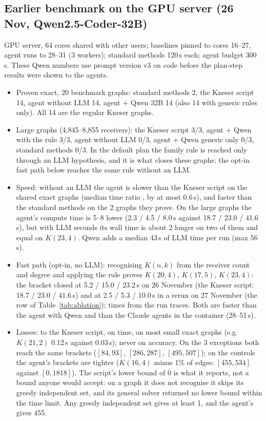 \subsection{Earlier benchmark on the GPU server (26 Nov, Qwen2.5-Coder-32B)}\label{sec:gpubench}
GPU server, 64 cores shared with other users; baselines pinned to cores 16--27, agent runs to 28--31 (3 workers);
standard methods 120\,s each; agent budget 300\,s. These Qwen numbers use prompt version v3 on code before the plan-step
results were shown to the agents.
\begin{itemize}
  \item Proven exact, 20 benchmark graphs: standard methods 2, the Kneser script 14, agent without LLM 14, agent +
  Qwen 32B 14 (also 14 with generic rules only). All 14 are the regular Kneser graphs.
  \item Large graphs (4{,}845--8{,}855 receivers): the Kneser script 3/3, agent + Qwen with the rule 3/3, agent
  without LLM 0/3, agent + Qwen generic only 0/3, standard methods 0/3. In the default plan the family rule is reached
  only through an LLM hypothesis, and it is what closes these graphs; the opt-in fast path below reaches the same
  rule without an LLM.
  \item Speed: without an LLM the agent is slower than the Kneser script on the shared exact graphs (median time
  ratio , by at most 0.6\,s), and  faster than the standard methods on the 2 graphs they prove. On the large
  graphs the agent's compute time is 5--8\x{} lower (2.3 / 4.5 / 8.0\,s against 18.7 / 23.0 / 41.6\,s), but with LLM
  seconds its wall time is about 2\x{} longer on two of them and equal on $K(23,4)$. Qwen adds a median 43\,s of LLM
  time per run (max 56\,s).
  \item Fast path (opt-in, no LLM): recognising $K(n,k)$ from the receiver count and degree and applying the rule
  proves $K(20,4)$, $K(17,5)$, $K(23,4)$: the bracket closed at 5.2 / 15.0 / 23.2\,s on 26 November (the Kneser
  script: 18.7 / 23.0 / 41.6\,s) and at 2.5 / 5.3 / 10.0\,s in a rerun on 27 November (the row of
  Table~\ref{tab:ablation}); times from the run traces. Both are faster than the agent with Qwen and than the Claude
  agents in the container (28--51\,s).
  \item Losses: to the Kneser script, on time, on most small exact graphs (e.g.\ $K(21,2)$ 0.12\,s against 0.03\,s);
  never on accuracy. On the 3 exceptions both reach the same brackets ($[84,93]$, $[286,287]$, $[495,507]$); on the
  controls the agent's brackets are tighter ($K(16,4)$ minus 1\% of edges: $[455,534]$ against $[0,1818]$). The
  script's lower bound of 0 is what it reports, not a bound anyone would accept: on a graph it does not recognise it
  skips its greedy independent set, and its general solver returned no lower bound within the time limit. Any greedy
  independent set gives at least 1, and the agent's gives 455.
\end{itemize}

